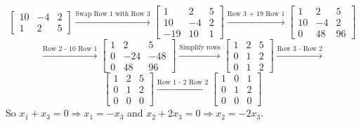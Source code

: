 \begin{enumerate}[font=\bfseries]
\begin{enumerate}
\[\begin{bmatrix}
                    10 & -4 & 2 \\
                    1 & 2 & 5
                \end{bmatrix}
                \overset{\text{Swap Row 1 with Row 3}}{\longrightarrow}
                \begin{bmatrix}
                    1 & 2 & 5 \\
                    10 & -4 & 2 \\
                    -19 & 10 & 1
                \end{bmatrix}
                \overset{\text{Row 3 + 19 Row 1}}{\longrightarrow}
                \begin{bmatrix}
                    1 & 2 & 5 \\
                    10 & -4 & 2 \\
                    0 & 48 & 96
                \end{bmatrix}
            \]
            \[
                \overset{\text{Row 2 - 10 Row 1}}{\longrightarrow}
                \begin{bmatrix}
                    1 & 2 & 5 \\
                    0 & -24 & -48 \\
                    0 & 48 & 96
                \end{bmatrix}
                \overset{\text{Simplify rows}}{\longrightarrow}
                \begin{bmatrix}
                    1 & 2 & 5 \\
                    0 & 1 & 2 \\
                    0 & 1 & 2
                \end{bmatrix}
                \overset{\text{Row 3 - Row 2}}{\longrightarrow}
            \]
            \[
                \begin{bmatrix}
                    1 & 2 & 5 \\
                    0 & 1 & 2 \\
                    0 & 0 & 0
                \end{bmatrix}
                \overset{\text{Row 1 - 2 Row 2}}{\longrightarrow}
                \begin{bmatrix}
                    1 & 0 & 1 \\
                    0 & 1 & 2 \\
                    0 & 0 & 0
                \end{bmatrix}
            \]
            So $x_1 + x_3 = 0 \Rightarrow x_1 = -x_3$
            and $x_2 + 2x_3 = 0 \Rightarrow x_2 = -2x_3$.


\end{enumerate}
\end{enumerate}
